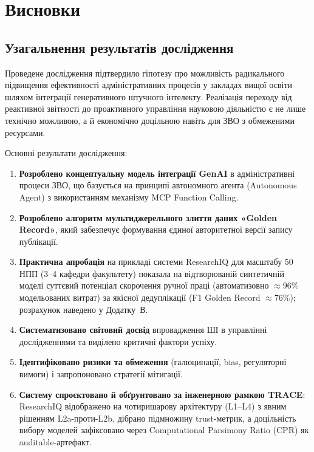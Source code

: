 \section*{Висновки}

\subsection*{Узагальнення результатів дослідження}

Проведене дослідження підтвердило гіпотезу про можливість радикального підвищення ефективності адміністративних процесів у закладах вищої освіти шляхом інтеграції генеративного штучного інтелекту. Реалізація переходу від реактивної звітності до проактивного управління науковою діяльністю є не лише технічно можливою, а й економічно доцільною навіть для ЗВО з обмеженими ресурсами.

Основні результати дослідження:
\begin{enumerate}[leftmargin=*,itemsep=0.25em]
\item \textbf{Розроблено концептуальну модель інтеграції GenAI} в адміністративні процеси ЗВО, що базується на принципі автономного агента (Autonomous Agent) з використанням механізму MCP Function Calling.
\item \textbf{Розроблено алгоритм мультиджерельного злиття даних «Golden Record»}, який забезпечує формування єдиної авторитетної версії запису публікації.
\item \textbf{Практична апробація} на прикладі системи ResearchIQ для масштабу 50 НПП (3--4 кафедри факультету) показала на відтворюваній синтетичній моделі суттєвий потенціал скорочення ручної праці (автоматизовно $\approx 96\%$ модельованих витрат) за якісної дедуплікації (F1 Golden Record $\approx 76\%$); розрахунок наведено у Додатку~В.
\item \textbf{Систематизовано світовий досвід} впровадження ШІ в управлінні дослідженнями та виділено критичні фактори успіху.
\item \textbf{Ідентифіковано ризики та обмеження} (галюцинації, bias, регуляторні вимоги) і запропоновано стратегії мітигації.
\iftrace
\item \textbf{Систему спроєктовано й обґрунтовано за інженерною рамкою TRACE}: ResearchIQ відображено на чотиришарову архітектуру (L1--L4) з явним рішенням L2a-проти-L2b, дібрано підмножину trust-метрик, а доцільність вибору моделей зафіксовано через Computational Parsimony Ratio (CPR) як auditable-артефакт.
\fi
\end{enumerate}

